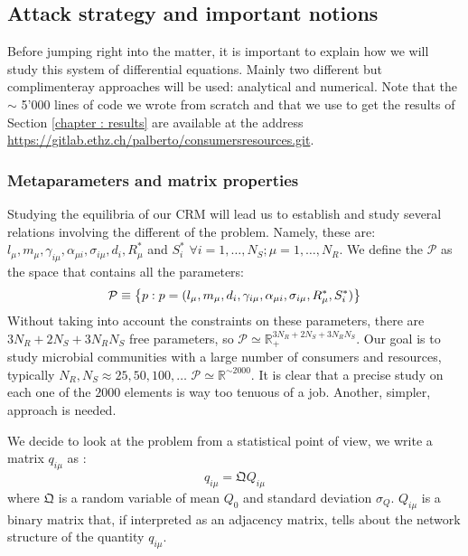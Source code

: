 \documentclass[12pt, titlepage]{report}
\begin{document}
\subsection{Attack strategy and important notions}
Before jumping right into the matter, it is important to explain how we will study this system of differential equations. Mainly two different but complimenteray approaches will be used: analytical and numerical. Note that the $\sim$ 5'000 lines of code we wrote from scratch and that we use to get the results of Section \ref{chapter : results} are available at the address \url{https://gitlab.ethz.ch/palberto/consumersresources.git}.

\subsubsection{Metaparameters and matrix properties}
Studying the equilibria of our CRM will lead us to establish and study several relations involving the different  of the problem. Namely, these are: $l_\mu, m_\mu, \gamma_{i\mu}, \alpha_{\mu i}, \sigma_{i\mu}, d_i, R^*_\mu$ and $S^*_i$ $\forall i=1, \dots, N_S; \mu=1, \dots, N_R$.
We define the  $\mathcal{P}$ as the space that contains all the parameters:
\begin{equation}
\mathcal{P} \equiv \left\{ p: p = (l_\mu,  m_\mu,d_i,  \gamma_{i\mu}, \alpha_{\mu i}, \sigma_{i\mu}, R^*_\mu, S^*_i) \right\}
\end{equation}
Without taking into account the constraints on these parameters, there are $3N_R+2N_S+3N_RN_S$ free parameters, so $\mathcal{P} \simeq \mathbb{R}_+^{3 N_R+2 N_S + 3 N_R N_S}$.
Our goal is to study microbial communities with a large number of consumers and resources, typically $N_R, N_S \approx 25, 50, 100, \dots$ \ie $\mathcal{P} \simeq \mathbb{R}^{\sim 2000}$. It is clear that a precise study on each one of the $2000$ elements is way too tenuous of a job. Another, simpler, approach is needed.

We decide to look at the problem from a statistical point of view, \ie we write a matrix $q_{i\mu}$ as \cite{pascual-garcia_mutualism_2017}:
 \begin{equation}
 q_{i\mu} = \mathfrak{Q} Q_{i\mu}
 \end{equation}
where $\mathfrak{Q}$ is a random variable of mean $Q_0$ and standard deviation $\sigma_Q$. $Q_{i\mu}$ is a binary matrix that, if interpreted as an adjacency matrix, tells about the network structure of the quantity $q_{i\mu}$.
\end{document}
